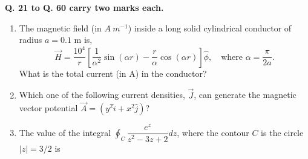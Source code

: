 \documentclass[14pt, a4paper]{extarticle}
\begin{document}
\vspace{1.5em}
\noindent 
\textbf{Q. 21 to Q. 60 carry two marks each.}
\vspace{1em}

\begin{enumerate}[label=\textbf{Q. \arabic*}, start=21]

\item The magnetic field (in $A~m^{-1}$) inside a long solid cylindrical conductor of radius $a = 0.1$ m is,
\[ \vec{H} = \dfrac{10^4}{r} \left[ \dfrac{1}{\alpha^2}\sin(\alpha r) - \dfrac{r}{\alpha}\cos(\alpha r) \right] \hat{\phi}, \quad \text{where } \alpha = \dfrac{\pi}{2a}. \]
What is the total current (in A) in the conductor?
\begin{enumerate}[label=(\Alph*)]
\end{enumerate}

\item Which one of the following current densities, $\vec{J}$, can generate the magnetic vector potential $\vec{A} = (y^2\hat{i} + x^2\hat{j})$?
\begin{enumerate}[label=(\Alph*)]
\end{enumerate}

\item The value of the integral 
$\displaystyle \oint_C \dfrac{e^z}{z^2 - 3z + 2} dz$, 
where the contour $C$ is the circle $|z| = 3/2$ is
\begin{enumerate}[label=(\Alph*)]
\end{enumerate}


\end{enumerate}
\end{document}

